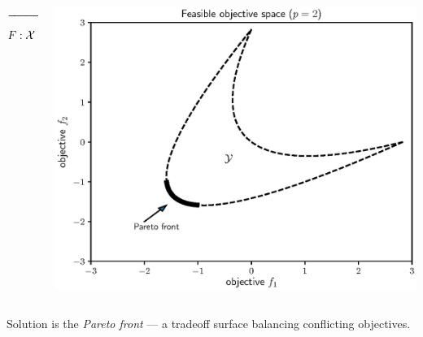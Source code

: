 \documentclass[aspectratio=169]{beamer}
\begin{document}
\begin{frame}
\begin{columns}
\begin{column}{.2\textwidth}
\begin{center}
{}
$\xrightarrow{\hspace*{2cm}}$
$$
F : {\cal X} \rightarrow {\cal Y}
$$
\end{center}
\end{column}
\begin{column}{.35\textwidth}
\includegraphics[width=\textwidth]{convex_pareto.eps}
\end{column}
\end{columns}
\medskip
Solution is the {\it Pareto front} --- a tradeoff surface balancing
conflicting objectives.
\end{frame}
\end{document}
